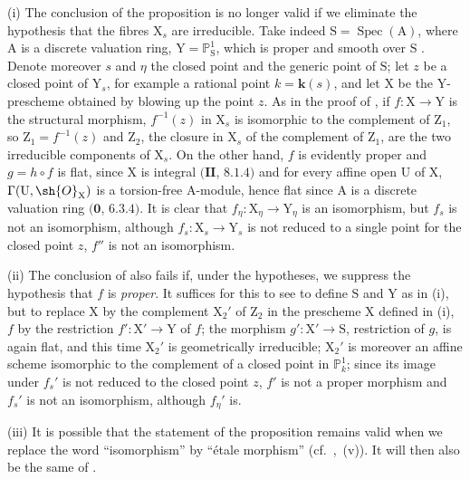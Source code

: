 \begin{remarks}[21.12.17]
\label{IV.21.12.17}
(i)
The conclusion of the proposition  is no longer valid if we eliminate the hypothesis that the fibres $\mathrm{X}_s$ are irreducible.
Take indeed $\mathrm{S}=\operatorname{Spec}(\mathrm{A})$, where $\mathrm{A}$ is a discrete valuation ring, $\mathrm{Y}=\mathbb{P}^1_{\mathrm{S}}$, which is proper and smooth over $\mathrm{S}$ .
Denote moreover $s$ and $\eta$ the closed point and the generic point of $\mathrm{S}$; let $z$ be a closed point of $\mathrm{Y}_s$, for example a rational point $k=\boldsymbol{k}(s)$, and let $\mathrm{X}$ be the $\mathrm{Y}$-prescheme obtained by blowing up the point $z$.
As in the proof of , if $f:\mathrm{X}\to\mathrm{Y}$ is the structural morphism, $f^{-1}(z)$ in $\mathrm{X}_s$ is isomorphic to the complement of $\mathrm{Z}_1$, so $\mathrm{Z}_1=f^{-1}(z)$ and $\mathrm{Z}_2$, the closure in $\mathrm{X}_s$ of the complement of $\mathrm{Z}_1$, are the two irreducible components of $\mathrm{X}_s$.
On the other hand, $f$ is evidently proper and $g=h\circ f$ is flat, since $\mathrm{X}$ is integral $(\mathbf{II}$, $8.1.4)$ and for every affine open $\mathrm{U}$ of $\mathrm{X}$, $\Gamma(\mathrm{U},\sh{O}_{\mathrm{X}})$ is a torsion-free A-module, hence flat since $\mathrm{A}$ is a discrete valuation ring $(\mathbf{0}$, $6.3.4)$.
It is clear that $f_\eta:\mathrm{X}_\eta\to\mathrm{Y}_\eta$ is an isomorphism, but $f_s$ is not an isomorphism, although $f_s:\mathrm{X}_s\to\mathrm{Y}_s$ is not reduced to a single point for the closed point $z$, $f''$ is not an isomorphism.

(ii)
The conclusion of  also fails if, under the hypotheses, we suppress the hypothesis that $f$ is \emph{proper}.
It suffices for this to see to define $\mathrm{S}$ and $\mathrm{Y}$ as in (i), but to replace $\mathrm{X}$ by the complement $\mathrm{X}_2'$ of $\mathrm{Z}_2$ in the prescheme $\mathrm{X}$ defined in (i), $f$ by the restriction $f':\mathrm{X}'\to\mathrm{Y}$ of $f$; the morphism $g':\mathrm{X}'\to\mathrm{S}$, restriction of $g$, is again flat, and this time $\mathrm{X}_2'$ is geometrically irreducible; $\mathrm{X}_2'$ is moreover an affine scheme isomorphic to the complement of a closed point in $\mathbb{P}^1_k$; since its image under $f_s'$ is not reduced to the closed point $z$, $f'$ is not a proper morphism and $f_s'$ is not an isomorphism, although $f_\eta'$ is.

(iii)
It is possible that the statement of the proposition  remains valid when we replace the word ``isomorphism'' by ``\'etale morphism'' (cf.\ ,~(v)).
It will then also be the same of .
\end{remarks}

